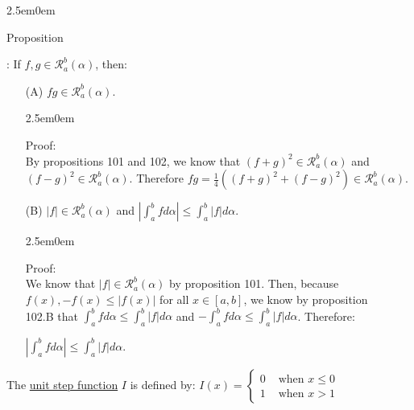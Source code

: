 \documentclass{book}
\newcommand{\hTwo}{%
   \color{MidnightBlue}%
   \fontsize{13}{15}\selectfont%
}
\newcommand{\hThree}{%
   \color{PineGreen!85!Orange}
   \fontsize{13}{15}\selectfont%
}
\newenvironment{myIndent}{%
   \begin{adjustwidth}{2.5em}{0em}%
}{%
   \end{adjustwidth}%
}
\newcommand{\udefine}[1]{{%
   \setulcolor{Red}%
   \setul{0.14em}{0.07em}%
   \ul{#1}%
}}
\newcounter{PropNumber}
\newcommand{\propCount}[1][1]{%
   \addtocounter{PropNumber}{#1}%
   \thePropNumber%
}
\newcommand{\retTwo}{\hfill\bigbreak}
\begin{document}
{\begin{myIndent}\hTwo
   Proposition \propCount: If $f, g \in \mathscr{R}_a^b(\alpha)$, then:
   \begin{enumerate}
      \item[(A)] $fg \in \mathscr{R}_a^b(\alpha)$.\\[-6pt]
      {\begin{myIndent}\hThree
         Proof:\\
         By propositions 101 and 102, we know that $(f + g)^2 \in \mathscr{R}_a^b(\alpha)$ and\\ $(f - g)^2 \in \mathscr{R}_a^b(\alpha)$.   Therefore {\fontsize{12.8}{14.8}\selectfont$fg = \frac{1}{4}\left((f+g)^2 + (f-g)^2\right) \in \mathscr{R}_a^b(\alpha)$}.
      \end{myIndent}}
      
      \newpage

      \item[(B)] $|f| \in \mathscr{R}_a^b(\alpha)$ and $\left|\int_a^b fd\alpha\right| \leq \int_a^b |f|d\alpha$.\\ [-6pt]
      
      {\begin{myIndent}\hThree
         Proof:\\
         We know that $|f| \in \mathscr{R}_a^b(\alpha)$ by proposition 101. Then, because\\ $f(x), -f(x) \leq |f(x)|$ for all $x \in [a, b]$, we know by proposition\\ 102.B that $\int_a^bfd\alpha \leq \int_a^b|f|d\alpha$ and $-\int_a^bfd\alpha \leq \int_a^b|f|d\alpha$. Therefore:
         
         {\centering$\left|\int_a^b fd\alpha\right| \leq \int_a^b |f|d\alpha$.\retTwo\retTwo\par}
      \end{myIndent}}
   \end{enumerate}
\end{myIndent}}

The \udefine{unit step function} $I$ is defined by: $I(x) = \left\{
\begin{matrix}
   0 & \text{ when } x \leq 0 \\
   1 & \text{ when } x > 1
\end{matrix}\right.$\retTwo
\end{document}
